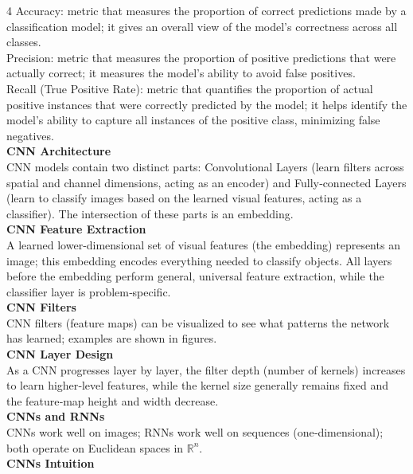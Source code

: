 \documentclass[8pt]{extarticle}
\begin{document}
\begin{multicols}{4}
Accuracy: metric that measures the proportion of correct predictions made by a classification model; it gives an overall view of the model’s correctness across all classes.\\
Precision: metric that measures the proportion of positive predictions that were actually correct; it measures the model’s ability to avoid false positives.\\
Recall (True Positive Rate): metric that quantifies the proportion of actual positive instances that were correctly predicted by the model; it helps identify the model’s ability to capture all instances of the positive class, minimizing false negatives.\\
\vspace{2pt}\textbf{CNN Architecture}\\
CNN models contain two distinct parts: Convolutional Layers (learn filters across spatial and channel dimensions, acting as an encoder) and Fully‑connected Layers (learn to classify images based on the learned visual features, acting as a classifier). The intersection of these parts is an embedding.\\
\vspace{2pt}\textbf{CNN Feature Extraction}\\
A learned lower‑dimensional set of visual features (the embedding) represents an image; this embedding encodes everything needed to classify objects. All layers before the embedding perform general, universal feature extraction, while the classifier layer is problem‑specific.\\
\vspace{2pt}\textbf{CNN Filters}\\
CNN filters (feature maps) can be visualized to see what patterns the network has learned; examples are shown in figures.\\
\vspace{2pt}\textbf{CNN Layer Design}\\
As a CNN progresses layer by layer, the filter depth (number of kernels) increases to learn higher‑level features, while the kernel size generally remains fixed and the feature‑map height and width decrease.\\
\vspace{2pt}\textbf{CNNs and RNNs}\\
CNNs work well on images; RNNs work well on sequences (one‑dimensional); both operate on Euclidean spaces in $\mathbb{R}^{n}$.\\
\vspace{2pt}\textbf{CNNs Intuition}\\

\end{multicols}
\end{document}
